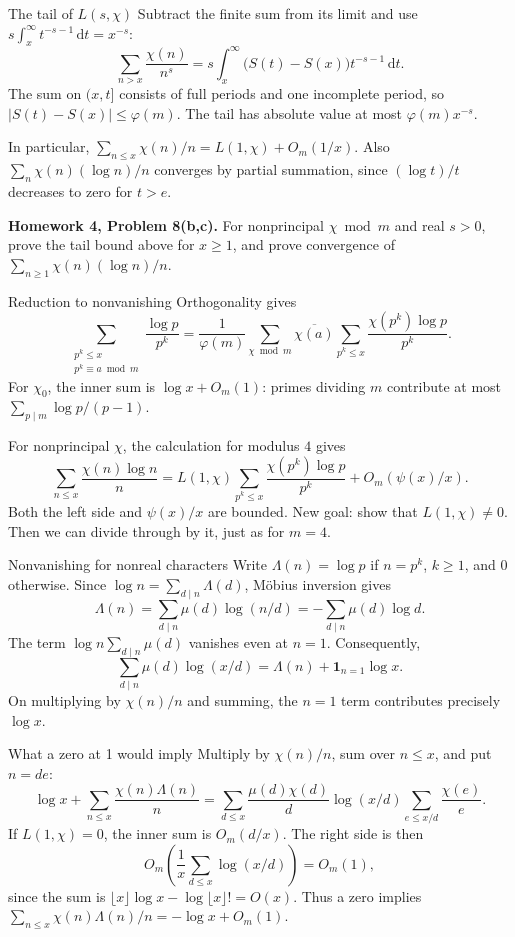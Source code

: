 \documentclass[aspectratio=169,11pt]{beamer}
\newcommand{\ind}{\mathbf1}
\newcommand{\dd}{\,\mathrm d}
\newcommand{\HW}[2]{{\color{teal}\textbf{Homework #1, Problem #2.}}}
\begin{document}
\begin{frame}{The tail of $L(s,\chi)$}
\small
Subtract the finite sum from its limit and use $s\int_x^\infty t^{-s-1}\dd t=x^{-s}$:
\[\sum_{n>x}\frac{\chi(n)}{n^s}=s\int_x^\infty\bigl(S(t)-S(x)\bigr)t^{-s-1}\dd t.\]
The sum on $(x,t]$ consists of full periods and one incomplete period, so $|S(t)-S(x)|\le\varphi(m)$. The tail has absolute value at most $\varphi(m)x^{-s}$.

In particular, $\sum_{n\le x}\chi(n)/n=L(1,\chi)+O_m(1/x)$. Also $\sum_n\chi(n)(\log n)/n$ converges by partial summation, since $(\log t)/t$ decreases to zero for $t>e$.

\HW{4}{8(b,c)} For nonprincipal $\chi\bmod m$ and real $s>0$, prove the tail bound above for $x\ge1$, and prove convergence of $\sum_{n\ge1}\chi(n)(\log n)/n$.
\end{frame}
\begin{frame}{Reduction to nonvanishing}
\small
Orthogonality gives
\[\sum_{\substack{p^k\le x\\p^k\equiv a\bmod m}}\frac{\log p}{p^k}
=\frac1{\varphi(m)}\sum_{\chi\bmod m}\overline{\chi(a)}\sum_{p^k\le x}\frac{\chi(p^k)\log p}{p^k}.\]
For $\chi_0$, the inner sum is $\log x+O_m(1)$: primes dividing $m$ contribute at most $\sum_{p\mid m}\log p/(p-1)$.

For nonprincipal $\chi$, the calculation for modulus $4$ gives
\[\sum_{n\le x}\frac{\chi(n)\log n}n=L(1,\chi)\sum_{p^k\le x}\frac{\chi(p^k)\log p}{p^k}+O_m(\psi(x)/x).\]
Both the left side and $\psi(x)/x$ are bounded. New goal: show that $L(1,\chi)\ne0$. Then we can divide through by it, just as for $m=4$.
\end{frame}
\begin{frame}{Nonvanishing for nonreal characters}
Write $\Lambda(n)=\log p$ if $n=p^k$, $k\ge1$, and $0$ otherwise. Since $\log n=\sum_{d\mid n}\Lambda(d)$, M\"obius inversion gives
\[\Lambda(n)=\sum_{d\mid n}\mu(d)\log(n/d)=-\sum_{d\mid n}\mu(d)\log d.\]
The term $\log n\sum_{d\mid n}\mu(d)$ vanishes even at $n=1$. Consequently,
\[\sum_{d\mid n}\mu(d)\log(x/d)=\Lambda(n)+\ind_{n=1}\log x.\]
On multiplying by $\chi(n)/n$ and summing, the $n=1$ term contributes precisely $\log x$.
\end{frame}
\begin{frame}{What a zero at 1 would imply}
Multiply by $\chi(n)/n$, sum over $n\le x$, and put $n=de$:
\[\log x+\sum_{n\le x}\frac{\chi(n)\Lambda(n)}n
=\sum_{d\le x}\frac{\mu(d)\chi(d)}d\log(x/d)\sum_{e\le x/d}\frac{\chi(e)}e.\]
If $L(1,\chi)=0$, the inner sum is $O_m(d/x)$. The right side is then
\[O_m\left(\frac1x\sum_{d\le x}\log(x/d)\right)=O_m(1),\]
since the sum is $\lfloor x\rfloor\log x-\log\lfloor x\rfloor!=O(x)$. Thus a zero implies $\sum_{n\le x}\chi(n)\Lambda(n)/n=-\log x+O_m(1)$.
\end{frame}
\end{document}
